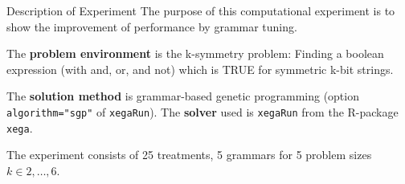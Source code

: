 \begin{frame}
\vspace*{2mm}
\begin{block}{
Description of Experiment
}
The purpose of this computational experiment is to show the improvement
of performance by grammar tuning.
 
The {\bf problem environment} is the k-symmetry problem: 
Finding a boolean expression (with and, or, and not)
which is TRUE for symmetric k-bit strings.
 
The {\bf solution method} is grammar-based genetic programming
(option {\tt algorithm="sgp"}  of {\tt xegaRun}).
The {\bf solver} used is {\tt xegaRun} from the R-package {\tt xega}.
 
The experiment consists of 25 treatments, 5 grammars for 5 problem sizes $k\in 2,\dots, 6$.
\end{block}
\end{frame}